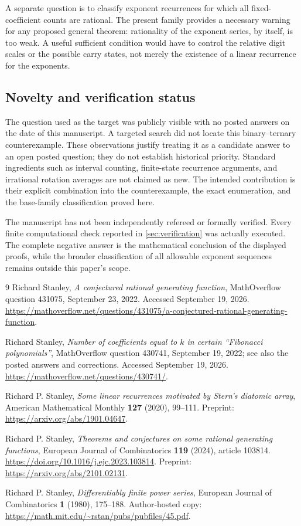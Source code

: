\documentclass[11pt,letterpaper]{article}
\numberwithin{equation}{section}
\theoremstyle{definition}
\theoremstyle{remark}
\begin{document}
A separate question is to classify exponent recurrences for which all fixed-coefficient counts are rational. The present family provides a necessary warning for any proposed general theorem: rationality of the exponent series, by itself, is too weak. A useful sufficient condition would have to control the relative digit scales or the possible carry states, not merely the existence of a linear recurrence for the exponents.

\subsection{Novelty and verification status}
The question used as the target was publicly visible with no posted answers on the date of this manuscript. A targeted search did not locate this binary--ternary counterexample. These observations justify treating it as a candidate answer to an open posted question; they do not establish historical priority. Standard ingredients such as interval counting, finite-state recurrence arguments, and irrational rotation averages are not claimed as new. The intended contribution is their explicit combination into the counterexample, the exact enumeration, and the base-family classification proved here.

The manuscript has not been independently refereed or formally verified. Every finite computational check reported in \cref{sec:verification} was actually executed. The complete negative answer is the mathematical conclusion of the displayed proofs, while the broader classification of all allowable exponent sequences remains outside this paper's scope.

\begin{thebibliography}{9}
Richard Stanley, \emph{A conjectured rational generating function}, MathOverflow question 431075, September 23, 2022. Accessed September 19, 2026.
\url{https://mathoverflow.net/questions/431075/a-conjectured-rational-generating-function}.

Richard Stanley, \emph{Number of coefficients equal to $k$ in certain ``Fibonacci polynomials''}, MathOverflow question 430741, September 19, 2022; see also the posted answers and corrections. Accessed September 19, 2026.
\url{https://mathoverflow.net/questions/430741/}.

Richard P. Stanley, \emph{Some linear recurrences motivated by Stern's diatomic array}, American Mathematical Monthly \textbf{127} (2020), 99--111.
Preprint: \url{https://arxiv.org/abs/1901.04647}.

Richard P. Stanley, \emph{Theorems and conjectures on some rational generating functions}, European Journal of Combinatorics \textbf{119} (2024), article 103814.
\url{https://doi.org/10.1016/j.ejc.2023.103814}.
Preprint: \url{https://arxiv.org/abs/2101.02131}.

Richard P. Stanley, \emph{Differentiably finite power series}, European Journal of Combinatorics \textbf{1} (1980), 175--188.
Author-hosted copy: \url{https://math.mit.edu/~rstan/pubs/pubfiles/45.pdf}.
\end{thebibliography}
\end{document}
